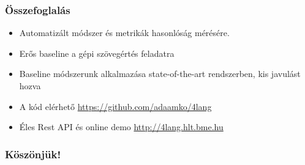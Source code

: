 \documentclass[bigger]{beamer}
\begin{document}
\begin{frame}
\frametitle{Összefoglalás}
\begin{itemize}
    \pause \item Automatizált módszer és metrikák hasonlóság mérésére.
    \pause \item Erős baseline a gépi szövegértés feladatra
    \pause \item Baseline módszerunk alkalmazása state-of-the-art rendszerben, kis javulást hozva
    \pause \item A kód elérhető \url{https://github.com/adaamko/4lang}
    \pause \item Éles Rest API és online demo \url{http://4lang.hlt.bme.hu}
\end{itemize}

\end{frame}
\begin{frame}
    \frametitle{Köszönjük!}
    \AtNextBibliography{\tiny}
    \printbibliography
\end{frame}
\end{document}
